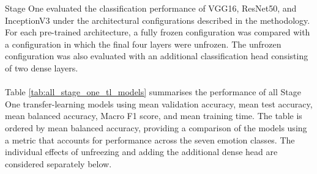 \documentclass[12pt, a4paper]{report}
\begin{document}
				Stage One evaluated the classification performance of VGG16, ResNet50, and InceptionV3 under the architectural configurations described in the methodology. For each pre-trained architecture, a fully frozen configuration was compared with a configuration in which the final four layers were unfrozen. The unfrozen configuration was also evaluated with an additional classification head consisting of two dense layers.\\\\
				Table \ref{tab:all_stage_one_tl_models} summarises the performance of all Stage One transfer-learning models using mean validation accuracy, mean test accuracy, mean balanced accuracy, Macro F1 score, and mean training time. The table is ordered by mean balanced accuracy, providing a comparison of the models using a metric that accounts for performance across the seven emotion classes. The individual effects of unfreezing and adding the additional dense head are considered separately below.
				\newpage
				\setlength{\tabcolsep}{3pt}
\end{document}
